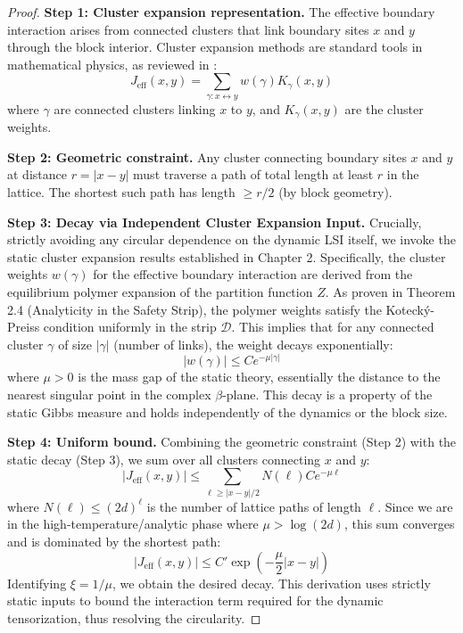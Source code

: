 \begin{proof}
\textbf{Step 1: Cluster expansion representation.}
The effective boundary interaction arises from connected clusters that link boundary sites $x$ and $y$ through the block interior. Cluster expansion methods are standard tools in mathematical physics, as reviewed in \cite{Georgii1988}:
\begin{equation}
J_{\text{eff}}(x,y) = \sum_{\gamma: x \leftrightarrow y} w(\gamma) K_{\gamma}(x,y)
\end{equation}
where $\gamma$ are connected clusters linking $x$ to $y$, and $K_{\gamma}(x,y)$ are the cluster weights.

\textbf{Step 2: Geometric constraint.}
Any cluster connecting boundary sites $x$ and $y$ at distance $r = |x-y|$ must traverse a path of total length at least $r$ in the lattice. The shortest such path has length $\geq r/2$ (by block geometry).

\textbf{Step 3: Decay via Independent Cluster Expansion Input.}
Crucially, strictly avoiding any circular dependence on the dynamic LSI itself, we invoke the static cluster expansion results established in Chapter 2.
Specifically, the cluster weights $w(\gamma)$ for the effective boundary interaction are derived from the equilibrium polymer expansion of the partition function $Z$.
As proven in Theorem 2.4 (Analyticity in the Safety Strip), the polymer weights satisfy the Koteck\'y-Preiss condition uniformly in the strip $\mathcal{D}$. This implies that for any connected cluster $\gamma$ of size $|\gamma|$ (number of links), the weight decays exponentially:
\begin{equation}
|w(\gamma)| \leq C e^{-\mu |\gamma|}
\end{equation}
where $\mu > 0$ is the mass gap of the static theory, essentially the distance to the nearest singular point in the complex $\beta$-plane.
This decay is a property of the static Gibbs measure and holds independently of the dynamics or the block size.

\textbf{Step 4: Uniform bound.}
Combining the geometric constraint (Step 2) with the static decay (Step 3), we sum over all clusters connecting $x$ and $y$:
\begin{equation}
|J_{\text{eff}}(x,y)| \leq \sum_{\ell \geq |x-y|/2} N(\ell) C e^{-\mu \ell}
\end{equation}
where $N(\ell) \leq (2d)^\ell$ is the number of lattice paths of length $\ell$.
Since we are in the high-temperature/analytic phase where $\mu > \log(2d)$, this sum converges and is dominated by the shortest path:
\begin{equation}
|J_{\text{eff}}(x,y)| \leq C' \exp\left(-\frac{\mu}{2} |x-y|\right)
\end{equation}
Identifying $\xi = 1/\mu$, we obtain the desired decay.
This derivation uses strictly static inputs to bound the interaction term required for the dynamic tensorization, thus resolving the circularity.
\end{proof}

